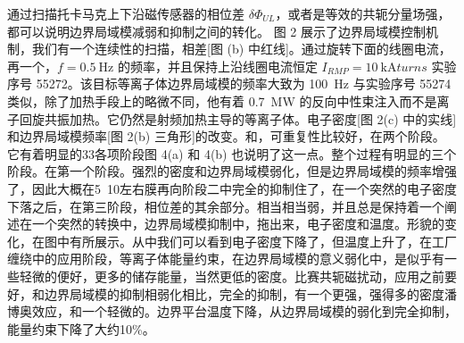 通过扫描托卡马克上下沿磁传感器的相位差 $\delta\Phi_{UL}$，或者是等效的共轭分量场强，都可以说明边界局域模减弱和抑制之间的转化。
图 2 展示了边界局域模控制机制，我们有一个连续性的扫描，相差[图 (b) 中红线]。通过旋转下面的线圈电流，再一个，$f=\SI{0.5}{\hertz}$ 的频率，并且保持上沿线圈电流恒定 $I_{RMP}= \SI{10}{\kilo\ampere turns}$ 实验序号 55272。该目标等离子体边界局域模的频率大致为 \SI{100}{\hertz} 与实验序号 55274 类似，除了加热手段上的略微不同，他有着 \SI{0.7}{\mega\watt} 的反向中性束注入而不是离子回旋共振加热。它仍然是射频加热主导的等离子体。电子密度[图 2(c) 中的实线]和边界局域模频率[图 2(b) 三角形]的改变。和，可重复性比较好，在两个阶段。它有着明显的33各项阶段图 4(a) 和 4(b) 也说明了这一点。整个过程有明显的三个阶段。在第一个阶段。强烈的密度和边界局域模弱化，但是边界局域模的频率增强了，因此大概在5~10左右膜再向阶段二中完全的抑制住了，在一个突然的电子密度下落之后，在第三阶段，相位差的其余部分。相当相当弱，并且总是保持着一个阐述在一个突然的转换中，边界局域模抑制中，拖出来，电子密度和温度。形貌的变化，在图中有所展示。从中我们可以看到电子密度下降了，但温度上升了，在工厂缠绕中的应用阶段，等离子体能量约束，在边界局域模的意义弱化中，是似乎有一些轻微的便好，更多的储存能量，当然更低的密度。比赛共轭磁扰动，应用之前要好，和边界局域模的抑制相弱化相比，完全的抑制，有一个更强，强得多的密度潘博奥效应，和一个轻微的。边界平台温度下降，从边界局域模的弱化到完全抑制，能量约束下降了大约10\%。

